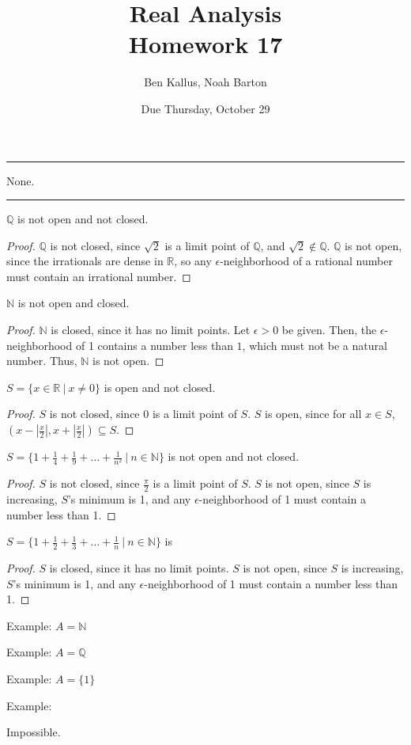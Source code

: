 \documentclass[12pt]{article}
\title{Real Analysis \\ Homework 17}
\author{Ben Kallus, Noah Barton}
\date{Due Thursday, October 29}
\begin{document}
\pagecolor{black}
\color{white}
\maketitle

\hrule
\bigskip

 None.

\bigskip
\hrule
\bigskip


\medskip
{} $\mathbb Q$ is not open and not closed.
\begin{proof}
    $\mathbb Q$ is not closed, since $\sqrt2$ is a limit point of $\mathbb Q$, and $\sqrt2 \notin \mathbb Q$. $\mathbb Q$ is not open, since the irrationals are dense in $\mathbb R$, so any $\epsilon$-neighborhood of a rational number must contain an irrational number.
\end{proof}

\medskip
{} $\mathbb N$ is not open and closed.
\begin{proof}
    $\mathbb N$ is closed, since it has no limit points. Let $\epsilon > 0$ be given. Then, the $\epsilon$-neighborhood of 1 contains a number less than $1$, which must not be a natural number. Thus, $\mathbb N$ is not open.
\end{proof}

\medskip
{} $S = \{x \in \mathbb R~|~x \neq 0\}$ is open and not closed.
\begin{proof}
    $S$ is not closed, since 0 is a limit point of $S$. $S$ is open, since for all $x \in S$, $(x - \left|\frac x2 \right|, x + \left|\frac x2 \right|) \subseteq S$.
\end{proof}

\medskip
{} $S = \{1 + \frac14 + \frac19 + \hdots + \frac1{n^2}~|~n\in \mathbb N\}$ is not open and not closed.
\begin{proof}
    $S$ is not closed, since $\frac\pi2$ is a limit point of $S$. $S$ is not open, since $S$ is increasing, $S$'s minimum is 1, and any $\epsilon$-neighborhood of 1 must contain a number less than 1.
\end{proof}

\medskip
{} $S = \{1 + \frac12 + \frac13 + \hdots + \frac1{n}~|~n\in \mathbb N\}$ is 
\begin{proof}
    $S$ is closed, since it has no limit points. $S$ is not open, since $S$ is increasing, $S$'s minimum is 1, and any $\epsilon$-neighborhood of 1 must contain a number less than 1.
\end{proof}

\newpage
{}

\medskip
{} Example: $A = \mathbb N$

    

\medskip
{} Example: $A = \mathbb Q$

    

\medskip
{} Example: $A = \{1\}$



\medskip
{} Example: 



\medskip
{} Impossible.
\end{document}
